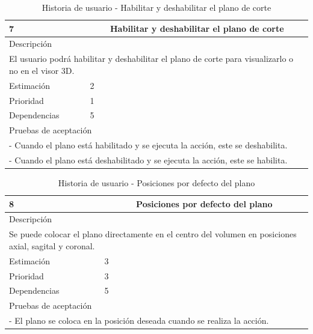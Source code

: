 \begin{table}[H]
	\begin{center}
		\begin{tabular} {|l|c|l|}
			\hline
			7 & \multicolumn{2}{c|}{Habilitar y deshabilitar el plano de corte} \\ \hline \hline
			\multicolumn{3}{|l|}{Descripción} \\ \hline
			\multicolumn{3}{|p{12cm}|}{El usuario podrá habilitar y deshabilitar el plano de corte para visualizarlo o no en el visor 3D.} \\ \hline
			\multicolumn{2}{|l|}{Estimación} & 2 \\ \hline
			\multicolumn{2}{|l|}{Prioridad} & 1 \\ \hline
			\multicolumn{2}{|l|}{Dependencias} & 5 \\ \hline
			\multicolumn{3}{|l|}{Pruebas de aceptación} \\ \hline
			\multicolumn{3}{|p{12cm}|}{ - Cuando el plano está habilitado y se ejecuta la acción, este se deshabilita.} \\
			\multicolumn{3}{|p{12cm}|}{ - Cuando el plano está deshabilitado y se ejecuta la acción, este se habilita.} \\ \hline
		\end{tabular}
	\end{center}
	\caption{Historia de usuario - Habilitar y deshabilitar el plano de corte}
	\label{tab:hu_habilitar_y_deshabilitar_el_plano_de_corte}
\end{table}

\begin{table}[H]
	\begin{center}
		\begin{tabular} {|l|c|l|}
			\hline
			8 & \multicolumn{2}{c|}{Posiciones por defecto del plano} \\ \hline \hline
			\multicolumn{3}{|l|}{Descripción} \\ \hline
			\multicolumn{3}{|p{12cm}|}{Se puede colocar el plano directamente en el centro del volumen en posiciones axial, sagital y coronal.} \\ \hline
			\multicolumn{2}{|l|}{Estimación} & 3 \\ \hline
			\multicolumn{2}{|l|}{Prioridad} & 3 \\ \hline
			\multicolumn{2}{|l|}{Dependencias} & 5 \\ \hline
			\multicolumn{3}{|l|}{Pruebas de aceptación} \\ \hline
			\multicolumn{3}{|p{12cm}|}{ - El plano se coloca en la posición deseada cuando se realiza la acción.} \\ \hline
		\end{tabular}
	\end{center}
	\caption{Historia de usuario - Posiciones por defecto del plano}
	\label{tab:hu_posiciones_por_defecto_del_plano}
\end{table}

